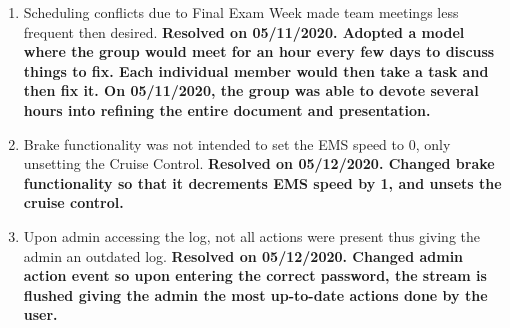 \documentclass[preprint,11pt,3p]{article}
\begin{document}
\begin{enumerate}
	\item Scheduling conflicts due to Final Exam Week made team meetings less frequent then desired. \textbf{Resolved on 05/11/2020. Adopted a model where the group would meet for an hour every few days to discuss things to fix. Each individual member would then take a task and then fix it. On 05/11/2020, the group was able to devote several hours into refining the entire document and presentation.}
	\item Brake functionality was not intended to set the EMS speed to 0, only unsetting the Cruise Control. \textbf{Resolved on 05/12/2020. Changed brake functionality so that it decrements EMS speed by 1, and unsets the cruise control.}
	\item Upon admin accessing the log, not all actions were present thus giving the admin an outdated log. \textbf{Resolved on 05/12/2020. Changed admin action event so upon entering the correct password, the stream is flushed giving the admin the most up-to-date actions done by the user.}



\end{enumerate}
\end{document}
